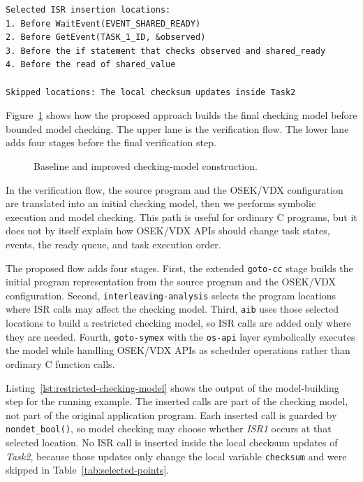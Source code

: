 \begin{lstlisting}[caption={Readable summary of the selected ISR insertion locations for the running example.},label={lst:selected-summary}]
Selected ISR insertion locations:
1. Before WaitEvent(EVENT_SHARED_READY)
2. Before GetEvent(TASK_1_ID, &observed)
3. Before the if statement that checks observed and shared_ready
4. Before the read of shared_value

Skipped locations: The local checksum updates inside Task2
\end{lstlisting}

Figure~\ref{fig:improved-pipeline} shows how the proposed approach builds the final checking model before bounded model checking. The upper lane is the verification flow. The lower lane adds four stages before the final verification step.

\begin{figure}[H]
  \centering
  \hspace*{-6mm}
  \caption{Baseline and improved checking-model construction.}
  \label{fig:improved-pipeline}
\end{figure}

In the verification flow, the source program and the OSEK/VDX configuration are translated into an initial checking model, then we performs symbolic execution and model checking. This path is useful for ordinary C programs, but it does not by itself explain how OSEK/VDX APIs should change task states, events, the ready queue, and task execution order.

The proposed flow adds four stages. First, the extended \texttt{goto-cc} stage builds the initial program representation from the source program and the OSEK/VDX configuration.
Second, \texttt{interleaving-analysis} selects the program locations where ISR calls may affect the checking model. 
Third, \texttt{aib} uses those selected locations to build a restricted checking model, so ISR calls are added only where they are needed. 
Fourth, \texttt{goto-symex} with the \texttt{os-api} layer symbolically executes the model while handling OSEK/VDX APIs as scheduler operations rather than ordinary C function calls.

Listing~\ref{lst:restricted-checking-model} shows the output of the model-building step for the running example. The inserted calls are part of the checking model, not part of the original application program. Each inserted call is guarded by \texttt{nondet\_bool()}, so model checking may choose whether \textit{ISR1} occurs at that selected location. No ISR call is inserted inside the local checksum updates of \textit{Task2}, because those updates only change the local variable \texttt{checksum} and were skipped in Table~\ref{tab:selected-points}.

